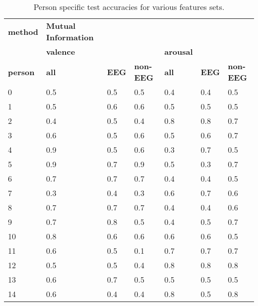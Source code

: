 \begin{table}[]
\centering
\caption{Person specific test accuracies for various features sets.}
\begin{tabular}{l|lll|lll}
\textbf{method}          & \textbf{Mutual Information}   &           &         &         &     &         \\
                & \textbf{valence}              &           &         & \textbf{arousal} &     &         \\
\textbf{person}          & \textbf{all}                  & \textbf{EEG}       & \textbf{non-EEG} & \textbf{all}     & \textbf{EEG} & \textbf{non-EEG} \\ \hline 
 0               & 0.5                  & 0.5       & 0.5     & 0.4     & 0.4 & 0.5     \\
1               & 0.5                  & 0.6       & 0.6     & 0.5     & 0.5 & 0.5     \\
2               & 0.4                  & 0.5       & 0.4     & 0.8     & 0.8 & 0.7     \\
3               & 0.6                  & 0.5       & 0.6     & 0.5     & 0.6 & 0.7     \\
4               & 0.9                  & 0.5       & 0.6     & 0.3     & 0.7 & 0.5     \\
5               & 0.9                  & 0.7       & 0.9     & 0.5     & 0.3 & 0.7     \\
6               & 0.7                  & 0.7       & 0.7     & 0.4     & 0.4 & 0.5     \\
7               & 0.3                  & 0.4       & 0.3     & 0.6     & 0.7 & 0.6     \\
8               & 0.7                  & 0.7       & 0.7     & 0.4     & 0.4 & 0.6     \\
9               & 0.7                  & 0.8       & 0.5     & 0.4     & 0.5 & 0.7     \\
10              & 0.8                  & 0.6       & 0.6     & 0.6     & 0.6 & 0.5     \\
11              & 0.6                  & 0.5       & 0.1     & 0.7     & 0.7 & 0.7     \\
12              & 0.5                  & 0.5       & 0.4     & 0.8     & 0.8 & 0.8     \\
13              & 0.6                  & 0.7       & 0.5     & 0.5     & 0.5 & 0.5     \\
14              & 0.6                  & 0.4       & 0.4     & 0.8     & 0.5 & 0.8     \\

\end{tabular}
\end{table}
